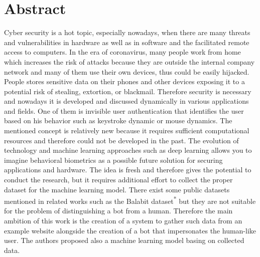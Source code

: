 \section{Abstract}\label{sec:abstract}
Cyber security is a hot topic, especially nowadays, when there are many threats and vulnerabilities in hardware as well as in software and the facilitated remote access to computers.
In the era of coronavirus, many people work from home which increases the risk of attacks because they are outside the internal company network and many of them use their own devices, thus could be easily hijacked.
People stores sensitive data on their phones and other devices exposing it to a potential risk of stealing, extortion, or blackmail.
Therefore security is necessary and nowadays it is developed and discussed dynamically in various applications and fields.
One of them is invisible user authentication that identifies the user based on his behavior such as keystroke dynamic or mouse dynamics.
The mentioned concept is relatively new because it requires sufficient computational resources and therefore could not be developed in the past.
The evolution of technology and machine learning approaches such as deep learning allows you to imagine behavioral biometrics as a possible future solution for securing applications and hardware.
The idea is fresh and therefore gives the potential to conduct the research, but it requires additional effort to collect the proper dataset for the machine learning model.
There exist some public datasets mentioned in related works such as the Balabit dataset\textsuperscript{*} but they are not suitable for the problem of distinguishing a bot from a human.
Therefore the main ambition of this work is the creation of a system to gather such data from an example website alongside the creation of a bot that impersonates the human-like user.
The authors proposed also a machine learning model basing on collected data.

